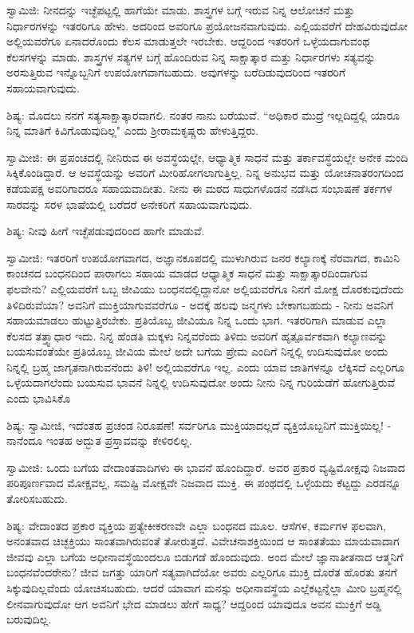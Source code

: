 ಸ್ವಾಮಿಜಿ: ನೀನದನ್ನು ಇಚ್ಛೆಪಟ್ಟಲ್ಲಿ ಹಾಗೆಯೇ ಮಾಡು. ಶಾಸ್ತ್ರಗಳ ಬಗ್ಗೆ ಇರುವ ನಿನ್ನ ಆಲೋಚನೆ ಮತ್ತು ನಿರ್ಧಾರಗಳನ್ನು ಇತರರಿಗೂ ಹೇಳು. ಅದರಿಂದ ಅವರಿಗೂ ಪ್ರಯೋಜನವಾಗುವುದು. ಎಲ್ಲಿಯವರೆಗೆ ದೇಹವಿರುವುದೋ ಅಲ್ಲಿಯವರೆಗೂ ಏನಾದರೊಂದು ಕೆಲಸ ಮಾಡುತ್ತಲೇ ಇರಬೇಕು. ಆದ್ದರಿಂದ ಇತರರಿಗೆ ಒಳ್ಳೆಯದಾಗುವಂಥ ಕೆಲಸಗಳನ್ನು ಮಾಡು. ಶಾಸ್ತ್ರಗಳ ಸತ್ಯಗಳ ಬಗ್ಗೆ ಹೊಂದಿರುವ ನಿನ್ನ ಸಾಕ್ಷಾತ್ಕಾರ ಮತ್ತು ನಿರ್ಧಾರಗಳು ಸತ್ಯವನ್ನು ಅರಸುತ್ತಿರುವ ಇನ್ನೊಬ್ಬನಿಗೆ ಉಪಯೋಗವಾಗಬಹುದು. ಅವುಗಳನ್ನು ಬರೆದಿಡುವುದರಿಂದ ಇತರರಿಗೆ ಸಹಾಯವಾಗುವುದು.

ಶಿಷ್ಯ: ಮೊದಲು ನನಗೆ ಸತ್ಯಸಾಕ್ಷಾತ್ಕಾರವಾಗಲಿ. ನಂತರ ನಾನು ಬರೆಯುವೆ. “ಅಧಿಕಾರ ಮುದ್ರೆ ಇಲ್ಲದಿದ್ದಲ್ಲಿ ಯಾರೂ ನಿನ್ನ ಮಾತಿಗೆ ಕಿವಿಗೊಡುವುದಿಲ್ಲ" ಎಂದು ಶ‍್ರೀರಾಮಕೃಷ್ಣರು ಹೇಳುತ್ತಿದ್ದರು.

ಸ್ವಾಮೀಜಿ: ಈ ಪ್ರಪಂಚದಲ್ಲಿ ನೀನಿರುವ ಈ ಅವಸ್ಥೆಯಲ್ಲೇ, ಆಧ್ಯಾತ್ಮಿಕ ಸಾಧನೆ ಮತ್ತು ತರ್ಕಾವಸ್ಥೆಯಲ್ಲೇ ಅನೇಕ ಮಂದಿ ಸಿಕ್ಕಿಕೊಂಡಿದ್ದಾರೆ. ಆ ಅವಸ್ಥೆಯನ್ನು ಅವರಿಗೆ ಮೀರಿಹೋಗಲಾಗುತ್ತಿಲ್ಲ. ನಿನ್ನ ಅನುಭವ ಮತ್ತು ಯೋಚನಾತರಂಗದಿಂದ ಕಡೆಯಪಕ್ಷ ಅವರಿಗಾದರೂ ಸಹಾಯವಾದೀತು. ನೀನು ಈ ಮಠದ ಸಾಧುಗಳೊಡನೆ ನಡೆಸಿದ ಸಂಭಾಷಣೆ ತರ್ಕಗಳ ಸಾರವನ್ನು ಸರಳ ಭಾಷೆಯಲ್ಲಿ ಬರೆದರೆ ಅನೇಕರಿಗೆ ಸಹಾಯವಾಗುವುದು.

ಶಿಷ್ಯ: ನೀವು ಹೀಗೆ ಇಚ್ಛೆಪಡುವುದರಿಂದ ಹಾಗೇ ಮಾಡುವೆ.

ಸ್ವಾಮೀಜಿ: ಇತರರಿಗೆ ಉಪಯೋಗವಾಗದ, ಅಜ್ಞಾನಕೂಪದಲ್ಲಿ ಮುಳುಗಿರುವ ಜನರ ಕಲ್ಯಾಣಕ್ಕೆ ನೆರವಾಗದ, ಕಾಮಿನಿ ಕಾಂಚನದ ಬಂಧನದಿಂದ ಪಾರಾಗಲು ಸಹಾಯ ಮಾಡದ ಆಧ್ಯಾತ್ಮಿಕ ಸಾಧನೆ ಮತ್ತು ಸಾಕ್ಷಾತ್ಕಾರದಿಂದಾಗುವ ಫಲವೇನು? ಎಲ್ಲಿಯವರೆಗೆ ಒಬ್ಬ ಜೀವಿಯು ಬಂಧನದಲ್ಲಿದ್ದಾನೋ ಅಲ್ಲಿಯವರೆಗೂ ನಿನಗೆ ಮೋಕ್ಷ ದೊರಕುವುದೆಂದು ತಿಳಿದಿರುವೆಯಾ? ಅವನಿಗೆ ಮುಕ್ತಿಯಾಗುವವರೆಗೂ - ಅದಕ್ಕೆ ಹಲವು ಜನ್ಮಗಳು ಬೇಕಾಗಬಹುದು - ನೀನು ಅವನಿಗೆ ಸಹಾಯಮಾಡಲು ಹುಟ್ಟುತ್ತಿರಬೇಕು. ಪ್ರತಿಯೊಬ್ಬ ಜೀವಿಯೂ ನಿನ್ನ ಒಂದು ಭಾಗ. ಇತರರಿಗಾಗಿ ಮಾಡುವ ಎಲ್ಲಾ ಕೆಲಸದ ತತ್ತ್ವಾಧಾರ ಇದು. ನಿನ್ನ ಹೆಂಡತಿ ಮಕ್ಕಳು ನಿನ್ನವರೆಂದು ತಿಳಿದು ಅವರಿಗೆ ಹೃತ್ಪೂರ್ವಕವಾಗಿ ಕಲ್ಯಾಣವನ್ನು ಬಯಸುವಂತೆಯೇ ಪ್ರತಿಯೊಬ್ಬ ಜೀವಿಯ ಮೇಲೆ ಅದೇ ಬಗೆಯ ಪ್ರೇಮ ಎಂದಿಗೆ ನಿನ್ನಲ್ಲಿ ಉದಿಸುವುದೋ ಅಂದು ನಿನ್ನಲ್ಲಿ ಬ್ರಹ್ಮ ಜಾಗೃತನಾಗಿರುವನೆಂದು ತಿಳಿ! ಅಲ್ಲಿಯವರೆಗೂ ಇಲ್ಲ. ಎಂದು ಯಾವ ಜಾತಿಗಳನ್ನೂ ಲೆಕ್ಕಿಸದೆ ಎಲ್ಲರಿಗೂ ಒಳ್ಳೆಯದಾಗಲೆಂದು ಬಯಸುವ ಭಾವನೆ ನಿನ್ನಲ್ಲಿ ಉದಿಸುವುದೋ ಅಂದು ನೀನು ನಿನ್ನ ಗುರಿಯೆಡೆಗೆ ಹೋಗುತ್ತಿರುವೆ ಎಂದು ಭಾವಿಸಿಕೊ

ಶಿಷ್ಯ: ಸ್ವಾಮೀಜಿ, ಇದೆಂತಹ ಪ್ರಚಂಡ ನಿರೂಪಣೆ! ಸರ್ವರಿಗೂ ಮುಕ್ತಿಯಾದಲ್ಲದೆ ವ್ಯಕ್ತಿಯೊಬ್ಬನಿಗೆ ಮುಕ್ತಿಯಿಲ್ಲ! - ನಾನೆಂದೂ ಇಂತಹ ಅದ್ಭುತ ಪ್ರಸ್ತಾವವನ್ನು ಕೇಳಿರಲಿಲ್ಲ.

ಸ್ವಾಮೀಜಿ: ಒಂದು ಬಗೆಯ ವೇದಾಂತವಾದಿಗಳು ಈ ಭಾವನೆ ಹೊಂದಿದ್ದಾರೆ. ಅವರ ಪ್ರಕಾರ ವ್ಯಷ್ಟಿಮೋಕ್ಷವು ನಿಜವಾದ ಪರಿಪೂರ್ಣವಾದ ಮೋಕ್ಷವಲ್ಲ, ಸಮಷ್ಟಿ ಮೋಕ್ಷವೇ ನಿಜವಾದ ಮುಕ್ತಿ. ಈ ಪಂಥದಲ್ಲಿ ಒಳ್ಳೆಯದು ಕೆಟ್ಟದ್ದು ಎರಡನ್ನೂ ತೋರಿಸಬಹುದು.

ಶಿಷ್ಯ: ವೇದಾಂತದ ಪ್ರಕಾರ ವ್ಯಕ್ತಿಯ ಪ್ರತ್ಯೇಕೀಕರಣವೇ ಎಲ್ಲಾ ಬಂಧನದ ಮೂಲ. ಆಸೆಗಳ, ಕರ್ಮಗಳ ಫಲವಾಗಿ, ಅನಂತವಾದ ಚಿಚ್ಛಕ್ತಿಯು ಸಾಂತವಾಗಿರುವಂತೆ ತೋರುತ್ತದೆ. ವಿವೇಚನಾಶಕ್ತಿಯಿಂದ ಆ ಸಾಂತತೆಯು ಮಾಯವಾದಾಗ ಜೀವವು ಎಲ್ಲಾ ಬಗೆಯ ಅಧೀನಾವಸ್ಥೆಯಿಂದಲೂ ಬಿಡುಗಡೆ ಹೊಂದುವುದು. ಅಂದ ಮೇಲೆ ಜ್ಞಾನಾತೀತನಾದ ಆತ್ಮನಿಗೆ ಬಂಧನವೆಂದರೇನು? ಜೀವ ಜಗತ್ತು ಯಾರಿಗೆ ಸತ್ಯವಾಗಿದೆಯೋ ಅವರು ಎಲ್ಲರಿಗೂ ಮುಕ್ತಿ ದೊರೆತ ಹೊರತು ತನಗೆ ಸಿಕ್ಕುವುದಿಲ್ಲವೆಂದು ಯೋಚಿಸಬಹುದು. ಆದರೆ ಯಾವಾಗ ಮನಸ್ಸು ಅಧೀನಾವಸ್ಥೆಯ ಎಲ್ಲೆಕಟ್ಟನ್ನೆಲ್ಲಾ ಮೀರಿ ಬ್ರಹ್ಮನಲ್ಲಿ ಲೀನವಾಗುವುದೋ ಆಗ ಅವನಿಗೆ ಭೇದ ಮಾಡಲು ಹೇಗೆ ಸಾಧ್ಯ? ಆದ್ದರಿಂದ ಯಾವುದೂ ಅವನ ಮುಕ್ತಿಗೆ ಅಡ್ಡಿ ಬರುವುದಿಲ್ಲ.

